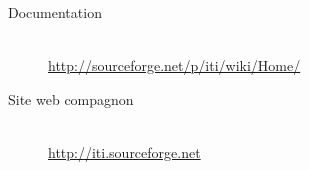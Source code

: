 			\begin{description}
				\item [Documentation]                       \hfill \\
					\url{http://sourceforge.net/p/iti/wiki/Home/}
				\item [Site web compagnon]    \hfill \\
					\url{http://iti.sourceforge.net}
			\end{description}

			
